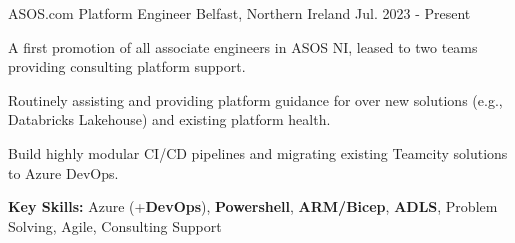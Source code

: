 
\begin{cventries}

  \cventry
  	{ASOS.com} %
    {Platform Engineer} %
    {Belfast, Northern Ireland} %
    {Jul. 2023 - Present} %
    {
    \begin{cvitems}
		\item {A first promotion of all associate engineers in ASOS NI, leased to two teams providing consulting platform support.}
		\item {Routinely assisting and providing platform guidance for over new solutions (e.g., Databricks Lakehouse) and existing platform health.}
		\item {Build highly modular CI/CD pipelines and migrating existing Teamcity solutions to Azure DevOps.}
        \item {\textbf{Key Skills:} Azure (+\textbf{DevOps}), \textbf{Powershell}, \textbf{ARM/Bicep}, \textbf{ADLS}, Problem Solving, Agile, Consulting Support}
     \end{cvitems}
    }


\end{cventries}
